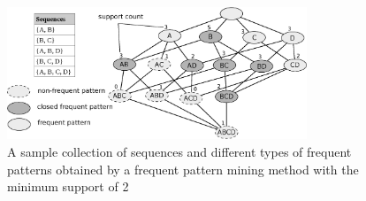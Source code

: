 \begin{figure}
\centering
\includegraphics[width=0.8\textwidth]{figures/fpm.eps}
\caption{A sample collection of sequences and different types of frequent patterns obtained by a frequent pattern mining method with the minimum support of 2}
\label{fig:fpm}
\end{figure}


